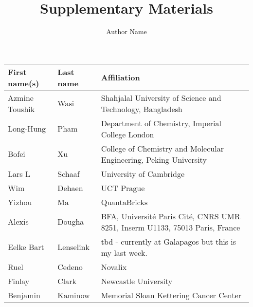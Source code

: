 \documentclass{article}
\title{Supplementary Materials}
\author{Author Name}
\begin{document}
\maketitle


\begin{table}[]
\begin{tabular}{lll}
First name(s) & Last name & Affiliation \\ \hline
\rowcolor[HTML]{FFFFFF} 
{\color[HTML]{434343} Azmine Toushik} & {\color[HTML]{434343} Wasi} & {\color[HTML]{434343} Shahjalal University of Science and Technology, Bangladesh} \\
\rowcolor[HTML]{FFFFFF} 
{\color[HTML]{434343} Long-Hung} & {\color[HTML]{434343} Pham} & {\color[HTML]{434343} Department of Chemistry, Imperial College London} \\
\rowcolor[HTML]{F8F9FA} 
{\color[HTML]{434343} Bofei} & {\color[HTML]{434343} Xu} & {\color[HTML]{434343} College of Chemistry and Molecular Engineering, Peking University} \\
\rowcolor[HTML]{FFFFFF} 
{\color[HTML]{434343} Lars L} & {\color[HTML]{434343} Schaaf} & {\color[HTML]{434343} University of Cambridge} \\
\rowcolor[HTML]{F8F9FA} 
{\color[HTML]{434343} Wim} & {\color[HTML]{434343} Dehaen} & {\color[HTML]{434343} UCT Prague} \\
\rowcolor[HTML]{FFFFFF} 
{\color[HTML]{434343} Yizhou} & {\color[HTML]{434343} Ma} & {\color[HTML]{434343} QuantaBricks} \\
\rowcolor[HTML]{F8F9FA} 
{\color[HTML]{434343} Alexis} & {\color[HTML]{434343} Dougha} & {\color[HTML]{434343} BFA, Université Paris Cité, CNRS UMR 8251, Inserm U1133, 75013 Paris, France} \\
\rowcolor[HTML]{FFFFFF} 
{\color[HTML]{434343} Eelke Bart} & {\color[HTML]{434343} Lenselink} & {\color[HTML]{434343} tbd - currently at Galapagos but this is my last week.} \\
\rowcolor[HTML]{F8F9FA} 
{\color[HTML]{434343} Ruel} & {\color[HTML]{434343} Cedeno} & {\color[HTML]{434343} Novalix} \\
\rowcolor[HTML]{FFFFFF} 
{\color[HTML]{434343} Finlay} & {\color[HTML]{434343} Clark} & {\color[HTML]{434343} Newcastle University} \\
\rowcolor[HTML]{F8F9FA} 
{\color[HTML]{434343} Benjamin} & {\color[HTML]{434343} Kaminow} & {\color[HTML]{434343} Memorial Sloan Kettering Cancer Center} \\

\end{tabular}
\end{table}
\end{document}
